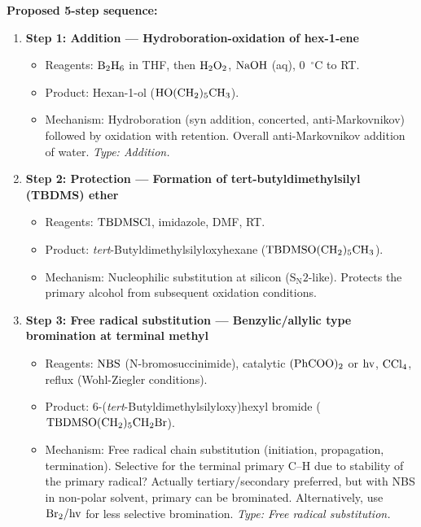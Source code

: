 \documentclass[11pt]{article}
\begin{document}
\begin{corrige}
\begin{enumerate}
\textbf{Proposed 5-step sequence:}

\begin{enumerate}
\item \textbf{Step 1: Addition — Hydroboration-oxidation of hex-1-ene}
   \begin{itemize}
   \item Reagents: \(\ce{B2H6}\) in THF, then \(\ce{H2O2}\), \(\ce{NaOH}\) (aq), \SI{0}{\ensuremath{{}^{\circ}\mathrm{C}}} to RT.
   \item Product: Hexan-1-ol (\(\ce{HO(CH2)5CH3}\)).
   \item Mechanism: Hydroboration (syn addition, concerted, anti-Markovnikov) followed by oxidation with retention. Overall anti-Markovnikov addition of water. \textit{Type: Addition.}
   \end{itemize}

\item \textbf{Step 2: Protection — Formation of tert-butyldimethylsilyl (TBDMS) ether}
   \begin{itemize}
   \item Reagents: \(\ce{TBDMSCl}\), imidazole, DMF, RT.
   \item Product: \textit{tert}-Butyldimethylsilyloxyhexane (\(\ce{TBDMSO(CH2)5CH3}\)).
   \item Mechanism: Nucleophilic substitution at silicon (\(\mathrm{S_N2}\)-like). Protects the primary alcohol from subsequent oxidation conditions.
   \end{itemize}

\item \textbf{Step 3: Free radical substitution — Benzylic/allylic type bromination at terminal methyl}
   \begin{itemize}
   \item Reagents: \(\ce{NBS}\) (N-bromosuccinimide), catalytic \(\ce{(PhCOO)2}\) or \(\ce{hv}\), \(\ce{CCl4}\), reflux (Wohl-Ziegler conditions).
   \item Product: 6-(\textit{tert}-Butyldimethylsilyloxy)hexyl bromide (\(\ce{TBDMSO(CH2)5CH2Br}\)).
   \item Mechanism: Free radical chain substitution (initiation, propagation, termination). Selective for the terminal primary C–H due to stability of the primary radical? Actually tertiary/secondary preferred, but with NBS in non-polar solvent, primary can be brominated. Alternatively, use \(\ce{Br2}/\ce{hv}\) for less selective bromination. \textit{Type: Free radical substitution.}
   \end{itemize}


\end{enumerate}
\end{enumerate}
\end{corrige}
\end{document}
